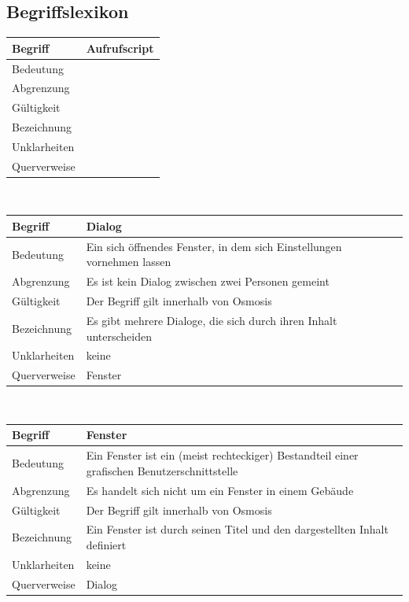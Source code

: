 \documentclass[a4paper,10pt]{scrartcl}
\begin{document}
\subsection{Begriffslexikon}
\begin{tabular}{|p{5cm}|p{10cm}|}
\hline Begriff & \textbf{Aufrufscript} \\ 
\hline Bedeutung &  \\ 
\hline Abgrenzung &  \\ 
\hline Gültigkeit &  \\ 
\hline Bezeichnung &  \\ 
\hline Unklarheiten &  \\ 
\hline Querverweise &  \\ 
\hline 
\end{tabular}
\\
\begin{tabular}{|p{5cm}|p{10cm}|}
\hline Begriff & \textbf{Dialog}\\ 
\hline Bedeutung & Ein sich öffnendes Fenster, in dem sich Einstellungen vornehmen lassen \\ 
\hline Abgrenzung & Es ist kein Dialog zwischen zwei Personen gemeint\\ 
\hline Gültigkeit & Der Begriff gilt innerhalb von Osmosis \\ 
\hline Bezeichnung & Es gibt mehrere Dialoge, die sich durch ihren Inhalt unterscheiden \\ 
\hline Unklarheiten & keine \\ 
\hline Querverweise & Fenster \\ 
\hline
\end{tabular}
\\
\begin{tabular}{|p{5cm}|p{10cm}|}
\hline Begriff & \textbf{Fenster}\\ 
\hline Bedeutung & Ein Fenster ist ein (meist rechteckiger) Bestandteil einer grafischen Benutzerschnittstelle \\ 
\hline Abgrenzung & Es handelt sich nicht um ein Fenster in einem Gebäude\\ 
\hline Gültigkeit & Der Begriff gilt innerhalb von Osmosis \\ 
\hline Bezeichnung & Ein Fenster ist durch seinen Titel und den dargestellten Inhalt definiert \\ 
\hline Unklarheiten & keine \\ 
\hline Querverweise & Dialog \\ 
\hline
\end{tabular}
\\
\end{document}
